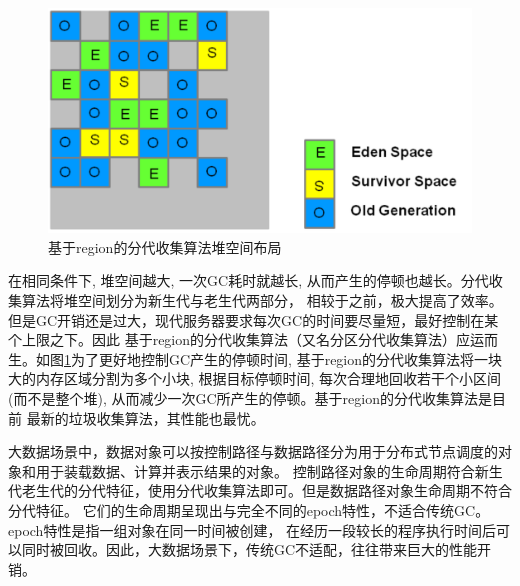 \begin{figure}[h]
    \centering
    \includegraphics[width=12cm]{figure/region-based-gc.png}
    \caption{基于region的分代收集算法堆空间布局\cite{G1}}
    \label{jvm_region-gc}
\end{figure}
在相同条件下, 堆空间越大, 一次GC耗时就越长, 从而产生的停顿也越长。分代收集算法将堆空间划分为新生代与老生代两部分，
相较于之前，极大提高了效率。但是GC开销还是过大，现代服务器要求每次GC的时间要尽量短，最好控制在某个上限之下。因此
基于region的分代收集算法（又名分区分代收集算法）应运而生。如图\ref{jvm_region-gc}为了更好地控制GC产生的停顿时间, 基于region的分代收集算法将一块大的内存区域分割为多个小块, 
根据目标停顿时间, 每次合理地回收若干个小区间(而不是整个堆), 从而减少一次GC所产生的停顿。基于region的分代收集算法是目前
最新的垃圾收集算法，其性能也最忧。

大数据场景中，数据对象可以按控制路径与数据路径分为用于分布式节点调度的对象和用于装载数据、计算并表示结果的对象。
控制路径对象的生命周期符合新生代老生代的分代特征，使用分代收集算法即可。但是数据路径对象生命周期不符合分代特征。
它们的生命周期呈现出与完全不同的epoch特性，不适合传统GC。epoch特性是指一组对象在同一时间被创建，
在经历一段较长的程序执行时间后可以同时被回收。因此，大数据场景下，传统GC不适配，往往带来巨大的性能开销。

